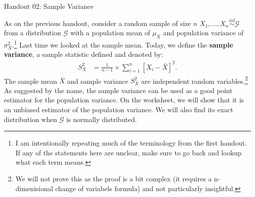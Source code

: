 \documentclass{tufte-handout}
\newcommand{\iid}{\stackrel{iid}{\sim}}
\begin{document}
\justify

{\LARGE Handout 02: Sample Variance}

\vspace*{18pt}

\noindent
As on the previous handout, consider a random sample of size $n$
$X_1, \ldots, X_n \iid \mathcal{G}$ from a distribution $\mathcal{G}$
with a population mean of $\mu_X$ and population variance of
$\sigma^2_X$.\footnote{
  I am intentionally repeating much of the terminology from the first handout.
  If any of the statements here are unclear, make sure to go back and lookup
  what each term means.
}
Last time we looked at the sample mean. Today, we define the
\textbf{sample variance}, a sample statistic defined and denoted by:
\begin{align*}
S^2_X &= \frac{1}{n - 1} \times \sum_{i=1}^n \left[ X_i - \bar{X} \right]^{2}.
\end{align*}
The sample mean $\bar{X}$ and sample variance $S^2_X$ are independent
random variables.\footnote{
  We will not prove this as the proof is a bit complex (it requires a n-dimenisional
  change of variabels formula) and not particularly insightful.
  }
As suggested by the name, the sample variance can be used as a good
point estimator for the population variance. On the worksheet, we will
show that it is an unbiased estimator of the population variance.
We will also find its exact distribution when $\mathcal{G}$ is normally
distributed.



\end{document}
